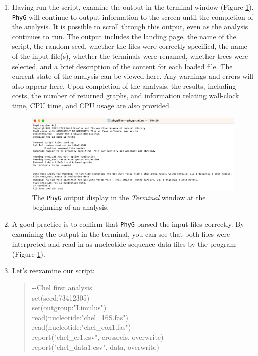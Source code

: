 \documentclass[]{article}
\newcommand{\phyg}{\texttt{PhyG} }
\begin{document}
\begin{enumerate}

\item Having run the script, examine the output in the terminal window 
(Figure \ref{output1}). \phyg will continue to output information to the screen 
until the completion of the analysis. It is possible to scroll through this output, 
even as the analysis continues to run. The output includes the landing page, 
the name of the script, the random seed, whether the files were 
correctly specified, the name of the input file(s), whether the terminals were 
renamed, whether trees were selected, and a brief description of the content 
for each loaded file. The current state of the analysis can be viewed here. Any 
warnings and errors will also appear here. Upon completion of the analysis, the 
results, including costs, the number of returned graphs, and information relating 
wall-clock time, CPU time, and CPU usage are also provided.

\begin{figure}
\centering
\includegraphics[width=\textwidth]{output1.png}
\caption{The \phyg output display in the \textit{Terminal} window at the beginning 
of an analysis.}
\label{output1}
\end{figure}

\item A good practice is to confirm that \phyg parsed the input files correctly. 
By examining the output in the terminal, you can see that both files were
interpreted and read in as nucleotide sequence data files by the program 
(Figure \ref{output1}).

\item Let's reexamine our script:

	\begin{quote}
	-\/-Chel first analysis\\
	set(seed:73412305)\\
	set(outgroup:"Limulus")\\
	read(nucleotide:"chel\_16S.fas")\\
	read(nucleotide:"chel\_cox1.fas")\\
	report("chel\_cr1.csv", crossrefs, overwrite)\\
	report("chel\_data1.csv", data, overwrite)\\
	\end{quote}
	

\end{enumerate}
\end{document}

